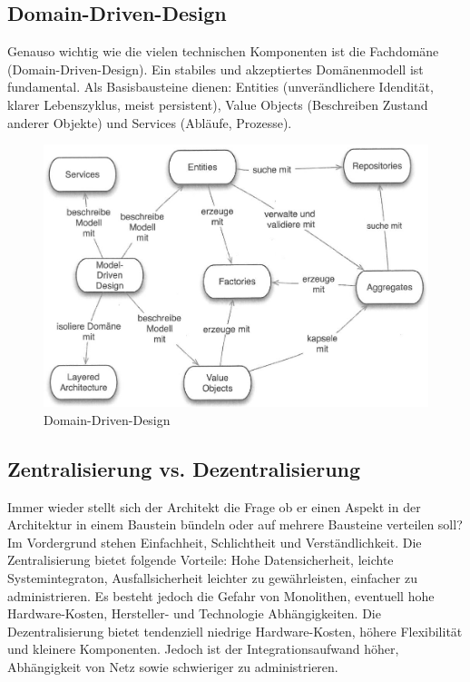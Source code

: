 \subsection{Domain-Driven-Design}
Genauso wichtig wie die vielen technischen Komponenten ist die Fachdomäne (Domain-Driven-Design). Ein stabiles und akzeptiertes Domänenmodell ist fundamental. Als Basisbausteine dienen: Entities (unverändlichere Idendität, klarer Lebenszyklus, meist persistent), Value Objects (Beschreiben Zustand anderer Objekte) und Services (Abläufe, Prozesse).

\begin{figure}[h!]
\centering
\includegraphics[width=0.7\linewidth]{fig/domain-driven-design}
\caption{Domain-Driven-Design}
\label{fig:domain-driven-design}
\end{figure}

\subsection{Zentralisierung vs. Dezentralisierung}
Immer wieder stellt sich der Architekt die Frage ob er einen Aspekt in der Architektur in einem Baustein bündeln oder auf mehrere Bausteine verteilen soll? Im Vordergrund stehen Einfachheit, Schlichtheit und Verständlichkeit. Die Zentralisierung bietet folgende Vorteile: Hohe Datensicherheit, leichte Systemintegraton, Ausfallsicherheit leichter zu gewährleisten, einfacher zu administrieren. Es besteht jedoch die Gefahr von Monolithen, eventuell hohe Hardware-Kosten, Hersteller- und Technologie Abhängigkeiten. Die Dezentralisierung bietet tendenziell niedrige Hardware-Kosten, höhere Flexibilität und kleinere Komponenten. Jedoch ist der Integrationsaufwand höher, Abhängigkeit von Netz sowie schwieriger zu administrieren.

